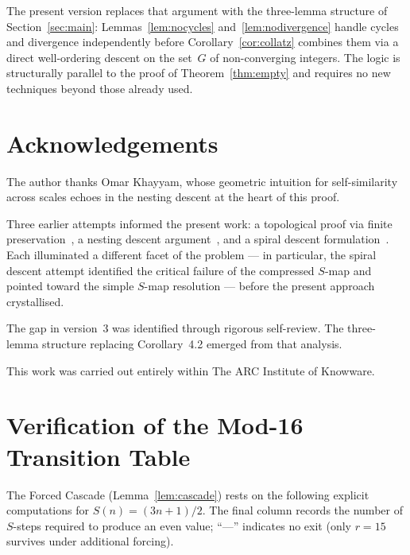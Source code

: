 \documentclass{amsart}
\theoremstyle{definition}
\theoremstyle{remark}
\begin{document}
The present version replaces that argument with the three-lemma structure
of Section~\ref{sec:main}: Lemmas~\ref{lem:nocycles}
and~\ref{lem:nodivergence} handle cycles and divergence independently
before Corollary~\ref{cor:collatz} combines them via a direct well-ordering
descent on the set~$G$ of non-converging integers.
The logic is structurally parallel to the proof of Theorem~\ref{thm:empty}
and requires no new techniques beyond those already used.

\section*{Acknowledgements}

The author thanks Omar Khayyam, whose geometric intuition for self-similarity
across scales echoes in the nesting descent at the heart of this proof.

Three earlier attempts informed the present work: a topological proof via
finite preservation~\cite{Wakil2025a}, a nesting descent
argument~\cite{Wakil2025b}, and a spiral descent
formulation~\cite{Wakil2025c}.
Each illuminated a different facet of the problem --- in particular, the
spiral descent attempt identified the critical failure of the compressed
$S$-map and pointed toward the simple $S$-map resolution --- before the
present approach crystallised.

The gap in version~3 was identified through rigorous self-review.
The three-lemma structure replacing Corollary~4.2 emerged from that analysis.

This work was carried out entirely within The ARC Institute of Knowware.


\appendix

\section{Verification of the Mod-16 Transition Table}
\label{app:cascade}

The Forced Cascade (Lemma~\ref{lem:cascade}) rests on the following explicit
computations for $S(n)=(3n+1)/2$.
The final column records the number of $S$-steps required to produce an even
value; ``---'' indicates no exit (only $r=15$ survives under additional
forcing).
\end{document}
